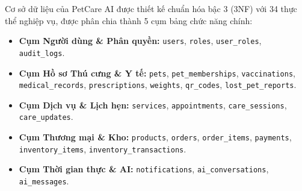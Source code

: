 Cơ sở dữ liệu của PetCare AI được thiết kế chuẩn hóa bậc 3 (3NF) với 34 thực thể nghiệp vụ, được phân chia thành 5 cụm bảng chức năng chính:
\begin{itemize}[leftmargin=1.5cm]
    \item \textbf{Cụm Người dùng \& Phân quyền:} \texttt{users}, \texttt{roles}, \texttt{user\_roles}, \texttt{audit\_logs}.
    \item \textbf{Cụm Hồ sơ Thú cưng \& Y tế:} \texttt{pets}, \texttt{pet\_memberships}, \texttt{vaccinations}, \texttt{medical\_records}, \texttt{prescriptions}, \texttt{weights}, \texttt{qr\_codes}, \texttt{lost\_pet\_reports}.
    \item \textbf{Cụm Dịch vụ \& Lịch hẹn:} \texttt{services}, \texttt{appointments}, \texttt{care\_sessions}, \texttt{care\_updates}.
    \item \textbf{Cụm Thương mại \& Kho:} \texttt{products}, \texttt{orders}, \texttt{order\_items}, \texttt{payments}, \texttt{inventory\_items}, \texttt{inventory\_transactions}.
    \item \textbf{Cụm Thời gian thực \& AI:} \texttt{notifications}, \texttt{ai\_conversations}, \texttt{ai\_messages}.
\end{itemize}
